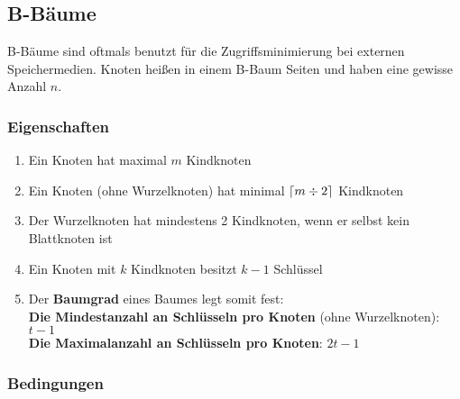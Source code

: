 \documentclass[10pt,a4paper]{article}
\begin{document}
\begin{multicols*}{4}
\endgroup

\subsection{B-Bäume}
B-Bäume sind oftmals benutzt für die Zugriffsminimierung bei externen Speichermedien. Knoten heißen in einem B-Baum
Seiten und haben eine gewisse Anzahl \(n\).

\begin{figure}[H]
	\centering
\end{figure}

\subsubsection{Eigenschaften}
\begin{enumerate}
	\item Ein Knoten hat maximal \(m\) Kindknoten
	\item Ein Knoten (ohne Wurzelknoten) hat minimal \(\lceil m\div2\rceil\) Kindknoten
	\item Der Wurzelknoten hat mindestens 2 Kindknoten, wenn er selbst kein Blattknoten ist
	\item Ein Knoten mit \(k\) Kindknoten besitzt \(k-1\) Schlüssel
	\item Der \textbf{Baumgrad} eines Baumes legt somit fest: \\
	      \textbf{Die Mindestanzahl an Schlüsseln pro Knoten} (ohne Wurzelknoten): \(t-1\) \\
	      \textbf{Die Maximalanzahl an Schlüsseln pro Knoten}: \(2t-1\)
\end{enumerate}

\subsubsection{Bedingungen}



\end{multicols*}
\end{document}
